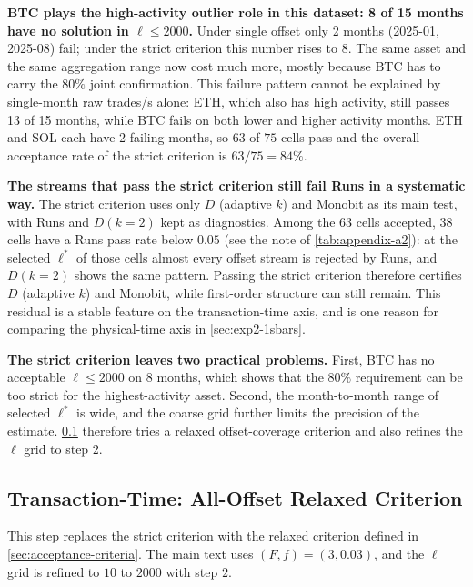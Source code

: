 \documentclass[11pt,titlepage,openany,oneside]{book}  %
\begin{document}
\textbf{BTC plays the high-activity outlier role in this dataset: 8 of 15 months have no solution in $\ell \leq 2000$.} Under single offset only 2 months (2025-01, 2025-08) fail; under the strict criterion this number rises to 8. The same asset and the same aggregation range now cost much more, mostly because BTC has to carry the $80\%$ joint confirmation. This failure pattern cannot be explained by single-month raw trades/s alone: ETH, which also has high activity, still passes 13 of 15 months, while BTC fails on both lower and higher activity months. ETH and SOL each have 2 failing months, so $63$ of $75$ cells pass and the overall acceptance rate of the strict criterion is $63/75 = 84\%$.

\textbf{The streams that pass the strict criterion still fail Runs in a systematic way.} The strict criterion uses only $D$ (adaptive $k$) and Monobit as its main test, with Runs and $D(k=2)$ kept as diagnostics. Among the 63 cells accepted, 38 cells have a Runs pass rate below $0.05$ (see the note of \cref{tab:appendix-a2}): at the selected $\ell^*$ of those cells almost every offset stream is rejected by Runs, and $D(k=2)$ shows the same pattern. Passing the strict criterion therefore certifies $D$ (adaptive $k$) and Monobit, while first-order structure can still remain. This residual is a stable feature on the transaction-time axis, and is one reason for comparing the physical-time axis in \cref{sec:exp2-1sbars}.

\textbf{The strict criterion leaves two practical problems.} First, BTC has no acceptable $\ell \leq 2000$ on 8 months, which shows that the $80\%$ requirement can be too strict for the highest-activity asset. Second, the month-to-month range of selected $\ell^*$ is wide, and the coarse grid further limits the precision of the estimate. \cref{sec:exp2-relaxed-criterion} therefore tries a relaxed offset-coverage criterion and also refines the $\ell$ grid to step $2$.

\subsection{Transaction-Time: All-Offset Relaxed Criterion}
\label{sec:exp2-relaxed-criterion}

This step replaces the strict criterion with the relaxed criterion defined in \cref{sec:acceptance-criteria}. The main text uses $(F, f) = (3, 0.03)$, and the $\ell$ grid is refined to $10$ to $2000$ with step $2$.
\end{document}
